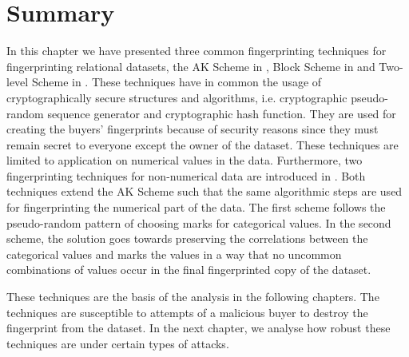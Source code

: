 \section{Summary}
In this chapter we have presented three common fingerprinting techniques for fingerprinting relational datasets, the AK Scheme in , Block Scheme in  and Two-level Scheme in . 
These techniques have in common the usage of cryptographically secure structures and algorithms, i.e. cryptographic pseudo-random sequence generator and cryptographic hash function. They are used for creating the buyers' fingerprints because of security reasons since they must remain secret to everyone except the owner of the dataset. 
These techniques are limited to application on numerical values in the data. 
Furthermore, two fingerprinting techniques for non-numerical data are introduced in .
Both techniques extend the AK Scheme such that the same algorithmic steps are used for fingerprinting the numerical part of the data. 
The first scheme follows the pseudo-random pattern of choosing marks for categorical values.
In the second scheme, the solution goes towards preserving the correlations between the categorical values and marks the values in a way that no uncommon combinations of values occur in the final fingerprinted copy of the dataset.

These techniques are the basis of the analysis in the following chapters. The techniques are susceptible to attempts of a malicious buyer to destroy the fingerprint from the dataset. 
In the next chapter, we analyse how robust these techniques are under certain types of attacks.